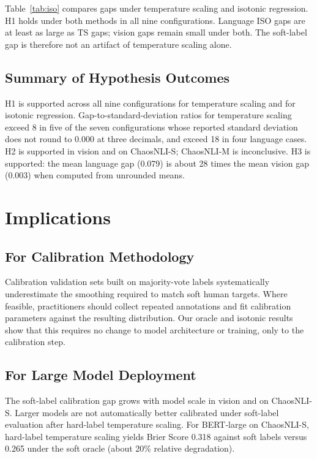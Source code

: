 \documentclass[11pt,a4paper]{article}
\theoremstyle{definition}
\begin{document}
Table~\ref{tab:iso} compares gaps under temperature scaling and isotonic
regression. H1 holds under both methods in all nine configurations.
Language ISO gaps are at least as large as TS gaps; vision gaps remain
small under both. The soft-label gap is therefore not an artifact of
temperature scaling alone.

\subsection{Summary of Hypothesis Outcomes}

H1 is supported across all nine configurations for temperature scaling
and for isotonic regression. Gap-to-standard-deviation ratios for
temperature scaling exceed 8 in five of the seven configurations whose
reported standard deviation does not round to 0.000 at three decimals,
and exceed 18 in four language cases. H2 is supported in vision
and on ChaosNLI-S; ChaosNLI-M is inconclusive. H3 is supported: the mean
language gap (0.079) is about 28 times the mean vision gap (0.003) when
computed from unrounded means.

\section{Implications}
\label{sec:implications}

\subsection{For Calibration Methodology}

Calibration validation sets built on majority-vote labels systematically
underestimate the smoothing required to match soft human targets. Where
feasible, practitioners should collect repeated annotations and fit
calibration parameters against the resulting distribution. Our oracle
and isotonic results show that this requires no change to model
architecture or training, only to the calibration step.

\subsection{For Large Model Deployment}

The soft-label calibration gap grows with model scale in vision and on
ChaosNLI-S. Larger models are not automatically better calibrated under
soft-label evaluation after hard-label temperature scaling. For
BERT-large on ChaosNLI-S, hard-label temperature scaling yields Brier
Score 0.318 against soft labels versus 0.265 under the soft oracle
(about 20\% relative degradation).
\end{document}

